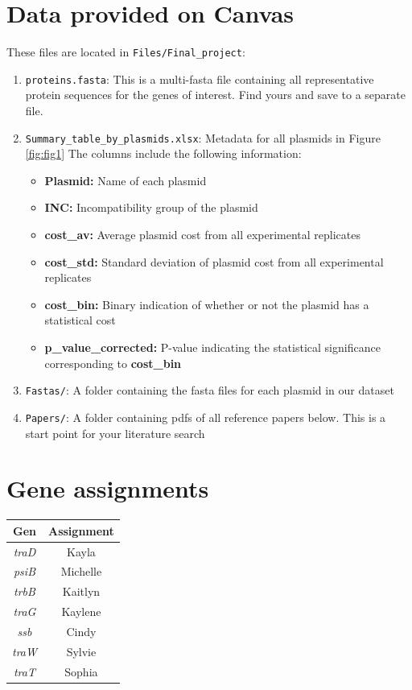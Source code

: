 \documentclass{article}
\begin{document}
\section*{Data provided on Canvas}
These files are located in \texttt{Files/Final\_project}:
\begin{enumerate}
    \item \texttt{proteins.fasta}: This is a multi-fasta file containing all representative protein sequences for the genes of interest. Find yours and save to a separate file.
    \item \texttt{Summary\_table\_by\_plasmids.xlsx}: Metadata for all plasmids in Figure \ref{fig:fig1} The columns include the following information:
    \begin{itemize}
        \item \textbf{Plasmid:} Name of each plasmid
        \item \textbf{INC:} Incompatibility group of the plasmid
        \item \textbf{cost\_av:} Average plasmid cost from all experimental replicates
        \item \textbf{cost\_std:} Standard deviation of plasmid cost from all experimental replicates
        \item \textbf{cost\_bin:} Binary indication of whether or not the plasmid has a statistical cost
        \item \textbf{p\_value\_corrected:} P-value indicating the statistical significance corresponding to \textbf{cost\_bin}
    \end{itemize}
    \item \texttt{Fastas/}: A folder containing the fasta files for each plasmid in our dataset
    \item \texttt{Papers/}: A folder containing pdfs of all reference papers below. This is a start point for your literature search
\end{enumerate}

\section*{Gene assignments}
\begin{table}[h!]
    \centering
    \begin{tabular}{|c|c|}
        \hline
        \textbf{Gen} &	\textbf{Assignment}\\
        \hline
        \textit{traD}	& Kayla\\
        \textit{psiB}	& Michelle\\
        \textit{trbB}	& Kaitlyn\\
        \textit{traG}	& Kaylene\\
        \textit{ssb}	& Cindy\\
        \textit{traW}	& Sylvie\\
        \textit{traT}	& Sophia\\
        \hline
    \end{tabular}
    \label{tab:assignments}
\end{table}
\end{document}
